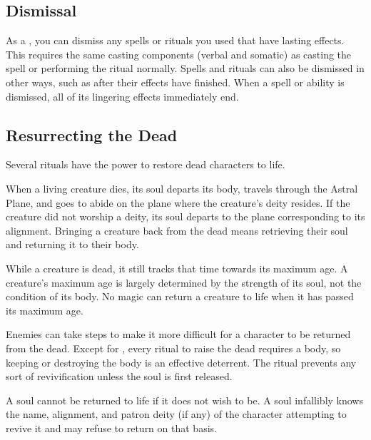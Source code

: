     \subsection{Dismissal}
        As a , you can dismiss any spells or rituals you used that have lasting effects.
        This requires the same casting components (verbal and somatic) as casting the spell or performing the ritual normally.
        Spells and rituals can also be dismissed in other ways, such as after their effects have finished.
        When a spell or ability is dismissed, all of its lingering effects immediately end.

    \subsection{Resurrecting the Dead}\label{Resurrecting the Dead}
        Several rituals have the power to restore dead characters to life.

        When a living creature dies, its soul departs its body, travels through the Astral Plane, and goes to abide on the plane where the creature's deity resides.
        If the creature did not worship a deity, its soul departs to the plane corresponding to its alignment.
        Bringing a creature back from the dead means retrieving their soul and returning it to their body.

         While a creature is dead, it still tracks that time towards its maximum age.
        A creature's maximum age is largely determined by the strength of its soul, not the condition of its body.
        No magic can return a creature to life when it has passed its maximum age.

         Enemies can take steps to make it more difficult for a character to be returned from the dead.
        Except for , every ritual to raise the dead requires a body, so keeping or destroying the body is an effective deterrent.
        The  ritual prevents any sort of revivification unless the soul is first released.

         A soul cannot be returned to life if it does not wish to be.
        A soul infallibly knows the name, alignment, and patron deity (if any) of the character attempting to revive it and may refuse to return on that basis.

